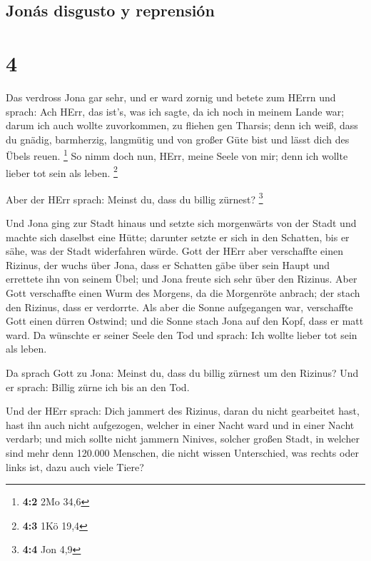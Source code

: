 \hypertarget{jonuxe1s-disgusto-y-reprensiuxf3n}{%
\subsection{Jonás disgusto y
reprensión}\label{jonuxe1s-disgusto-y-reprensiuxf3n}}

\hypertarget{section-3}{%
\section{4}\label{section-3}}

 Das verdross Jona gar sehr, und er ward zornig
 und betete zum HErrn und sprach: Ach HErr, das ist's, was
ich sagte, da ich noch in meinem Lande war; darum ich auch wollte
zuvorkommen, zu fliehen gen Tharsis; denn ich weiß, dass du gnädig,
barmherzig, langmütig und von großer Güte bist und lässt dich des Übels
reuen. \footnote{\textbf{4:2} 2Mo 34,6}  So nimm doch nun,
HErr, meine Seele von mir; denn ich wollte lieber tot sein als leben.
\footnote{\textbf{4:3} 1Kö 19,4}

 Aber der HErr sprach: Meinst du, dass du billig zürnest?
\footnote{\textbf{4:4} Jon 4,9}

 Und Jona ging zur Stadt hinaus und setzte sich
morgenwärts von der Stadt und machte sich daselbst eine Hütte; darunter
setzte er sich in den Schatten, bis er sähe, was der Stadt widerfahren
würde.  Gott der HErr aber verschaffte einen Rizinus, der
wuchs über Jona, dass er Schatten gäbe über sein Haupt und errettete ihn
von seinem Übel; und Jona freute sich sehr über den Rizinus.
 Aber Gott verschaffte einen Wurm des Morgens, da die
Morgenröte anbrach; der stach den Rizinus, dass er verdorrte.
 Als aber die Sonne aufgegangen war, verschaffte Gott
einen dürren Ostwind; und die Sonne stach Jona auf den Kopf, dass er
matt ward. Da wünschte er seiner Seele den Tod und sprach: Ich wollte
lieber tot sein als leben.

 Da sprach Gott zu Jona: Meinst du, dass du billig zürnest
um den Rizinus? Und er sprach: Billig zürne ich bis an den Tod.

 Und der HErr sprach: Dich jammert des Rizinus, daran du
nicht gearbeitet hast, hast ihn auch nicht aufgezogen, welcher in einer
Nacht ward und in einer Nacht verdarb;  und mich sollte
nicht jammern Ninives, solcher großen Stadt, in welcher sind mehr denn
120.000 Menschen, die nicht wissen Unterschied, was rechts oder links
ist, dazu auch viele Tiere?

